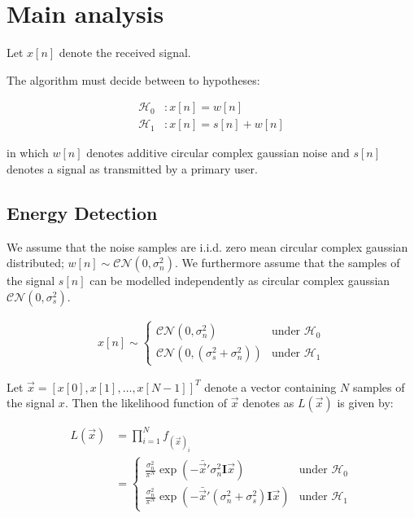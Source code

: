 \documentclass[a4paper, openany, oneside]{memoir}
\begin{document}
\section{Main analysis}

Let $x[n]$ denote the received signal. 

The algorithm must decide between to hypotheses:

\begin{align}\label{eq:hypotheses}
  \mathcal{H}_0&: x[n] = w[n]\\
  \mathcal{H}_1&: x[n] = s[n] + w[n]
\end{align}

in which $w[n]$ denotes additive circular complex gaussian noise and $s[n]$ denotes a signal as transmitted by a primary user.

\subsection{Energy Detection}
We assume that the noise samples are i.i.d. zero mean circular complex gaussian distributed; $w[n] \sim \mathcal{CN}(0, \sigma_n^2)$. 
We furthermore assume that the samples of the signal $s[n]$ can be modelled independently as circular complex gaussian $\mathcal{CN}(0, \sigma_s^2)$. %

\begin{align*}
x[n] \sim 
    \begin{cases}
        \mathcal{CN}(0, \sigma_n^2) & \text{under $\mathcal{H}_0$} \\
        \mathcal{CN}(0, (\sigma_s^2 + \sigma_n^2)) & \text{under $\mathcal{H}_1$}
    \end{cases}
\end{align*} 

Let $\vec{x} = \left[x[0], x[1], \ldots, x[N-1]\right]^T$ denote a vector containing $N$ samples of the signal $x$. Then the likelihood function of $\vec{x}$ denotes as $L(\vec{x})$ is given by:

\begin{align*}
    L(\vec{x}) &= \prod_{i=1}^N f_{(\vec{x})_i}\\
    &= \begin{cases}
        \frac{\sigma_n^2}{\pi^N } \exp(-\bar{\vec{x}}'\sigma_n^2\mathbf{I}\vec{x}) & \text{under $\mathcal{H}_0$} \\
        \frac{\sigma_n^2}{\pi^N } \exp(-\bar{\vec{x}}'(\sigma_n^2+\sigma_s^2)\mathbf{I}\vec{x}) & \text{under $\mathcal{H}_1$}
    \end{cases}
\end{align*}
\end{document}

